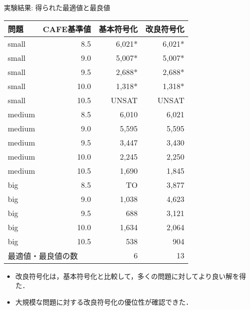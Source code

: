 \documentclass[dvipdfmx, 11pt,]{beamer}
\begin{document}
\begin{frame}{実験結果: 得られた最適値と最良値}
 \begin{exampleblock}{}
  \centering
  \scriptsize
  \begin{tabular}{l|r|r|r}
   問題 & CAFE基準値 & 基本符号化 & 改良符号化 \\\hline
   small & 8.5   & \alert{6,021*} & \alert{6,021*}       \\
   small & 9.0   & \alert{5,007*} & \alert{5,007*}       \\
   small & 9.5   & \alert{2,688*} & \alert{2,688*}       \\
   small & 10.0  & \alert{1,318*} & \alert{1,318*}       \\
   small & 10.5  & UNSAT          & UNSAT    \\\hline
   medium & 8.5  & 6,010          & \alert{6,021}        \\
   medium & 9.0  & \alert{5,595}  & \alert{5,595}        \\
   medium & 9.5  & \alert{3,447}  & 3,430        \\
   medium & 10.0 & 2,245          & \alert{2,250}        \\
   medium & 10.5 & 1,690          & \alert{1,845}        \\\hline
   big & 8.5     & TO             & \alert{3,877}        \\
   big & 9.0     & 1,038          & \alert{4,623}        \\
   big & 9.5     & 688            & \alert{3,121}        \\
   big & 10.0    & 1,634          & \alert{2,064}        \\
   big & 10.5    & 538            & \alert{904}         \\\hline
   \multicolumn{2}{l}{最適値・最良値の数} & \multicolumn{1}{r}{6} & \alert{13} \\
  \end{tabular}
 \end{exampleblock}
 \begin{itemize}
  \item 改良符号化は，基本符号化と比較して，多くの問題に対してより良い解を得た．
  \item 大規模な問題に対する改良符号化の優位性が確認できた．
 \end{itemize}	
\end{frame}
\end{document}
